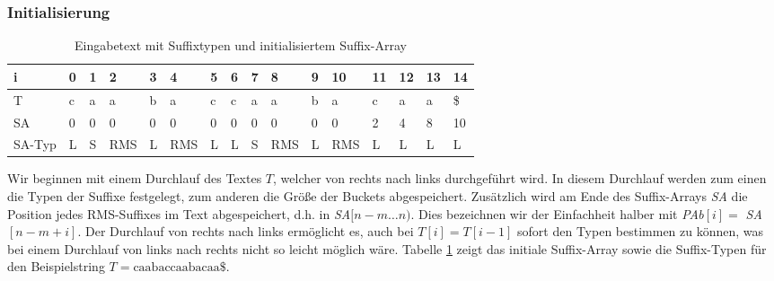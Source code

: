 \subsubsection{Initialisierung}


\begin{table}
	\centering
	\resizebox{\columnwidth}{!} {%
		\begin{tabular}{l|l|l|l|l|l|l|l|l|l|l|l|l|l|l|l}
			i      & 0 & 1 & 2   & 3 & 4   & 5 & 6 & 7 & 8   & 9 & 10  & 11 & 12 & 13 & 14 \\ \hline
			T      & c & a & a   & b & a   & c & c & a & a   & b & a   & c  & a  & a  & \$ \\ \hline
			SA     & 0 & 0 & 0   & 0 & 0   & 0 & 0 & 0 & 0   & 0 & 0   & \cellcolor[HTML]{32CB00}2  & \cellcolor[HTML]{32CB00}4  & \cellcolor[HTML]{32CB00}8  & \cellcolor[HTML]{32CB00}10 \\ \hline
			SA-Typ & L & S & RMS & L & RMS & L & L & S & RMS & L & RMS & L  & L  & L  & L 
		\end{tabular}%
	}
	\caption{Eingabetext mit Suffixtypen und initialisiertem Suffix-Array}
	\label{table:sa-init}
\end{table}





Wir beginnen mit einem Durchlauf des Textes $T$, welcher von rechts nach links durchgeführt wird. In diesem Durchlauf werden zum einen die Typen der Suffixe festgelegt, zum anderen die Größe der Buckets abgespeichert. Zusätzlich wird am Ende des Suffix-Arrays \textit{SA} die Position jedes RMS-Suffixes im Text abgespeichert, d.h. in \textit{SA}$[n-m\dots n)$. Dies bezeichnen wir der Einfachheit halber mit \textit{PAb}$[i] = $ \textit{SA}$[n-m+i]$. Der Durchlauf von rechts nach links ermöglicht es, auch bei $T[i] = T[i-1]$ sofort den Typen bestimmen zu können, was bei einem Durchlauf von links nach rechts nicht so leicht möglich wäre. Tabelle \ref{table:sa-init} zeigt das initiale Suffix-Array sowie die Suffix-Typen für den Beispielstring $ T = \text{caabaccaabacaa\$}$.



